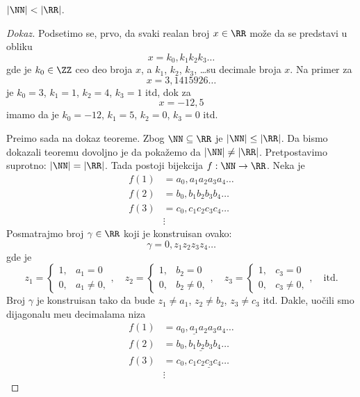\begin{THM}[Kantor]
  $|\NN| < |\RR|$.
\end{THM}
\begin{proof}[Dokaz]
  Podsetimo se, prvo, da svaki realan broj $x \in \RR$ mo\v ze da se predstavi u obliku
  $$
    x = k_0,k_1 k_2 k_3 \ldots
  $$
  gde je $k_0 \in \ZZ$ ceo deo broja $x$, a $k_1$, $k_2$, $k_3$, \ldots su decimale broja $x$. Na primer za
  $$
    x = 3,1415926\ldots
  $$
  je $k_0 = 3$, $k_1 = 1$, $k_2 = 4$, $k_3 = 1$ itd, dok za
  $$
    x = -12,5
  $$
  imamo da je $k_0 = -12$, $k_1 = 5$, $k_2 = 0$, $k_3 = 0$ itd.

  Pre\dj imo sada na dokaz teoreme.
  Zbog $\NN \subseteq \RR$ je $|\NN| \le |\RR|$. Da bismo dokazali teoremu dovoljno je da poka\v zemo da $|\NN| \ne |\RR|$.
  Pretpostavimo suprotno: $|\NN| = |\RR|$. Tada postoji bijekcija $f : \NN \to \RR$. Neka je
  \begin{align*}
    f(1) &= a_0, a_1 a_2 a_3 a_4 \ldots\\
    f(2) &= b_0, b_1 b_2 b_3 b_4 \ldots\\
    f(3) &= c_0, c_1 c_2 c_3 c_4 \ldots\\
         &\vdots
  \end{align*}
  Posmatrajmo broj $\gamma \in \RR$ koji je konstruisan ovako:
  $$
    \gamma = 0, z_1 z_2 z_3 z_4 \ldots
  $$
  gde je
  $$
    z_1 = \begin{cases}
      1, & a_1 = 0\\
      0, & a_1 \ne 0,
    \end{cases},
    \quad
    z_2 = \begin{cases}
      1, & b_2 = 0\\
      0, & b_2 \ne 0,
    \end{cases},
    \quad
    z_3 = \begin{cases}
      1, & c_3 = 0\\
      0, & c_3 \ne 0,
    \end{cases},
    \quad
    \text{itd.}
  $$
  Broj $\gamma$ je konstruisan tako da bude $z_1 \ne a_1$, $z_2 \ne b_2$, $z_3 \ne c_3$ itd.
  Dakle, uo\v cili smo dijagonalu me\dj u decimalama niza
  \begin{align*}
    f(1) &= a_0, \underline{a_1} a_2 a_3 a_4 \ldots\\
    f(2) &= b_0, b_1 \underline{b_2} b_3 b_4 \ldots\\
    f(3) &= c_0, c_1 c_2 \underline{c_3} c_4 \ldots\\
         &\vdots
  \end{align*}

\end{proof}

